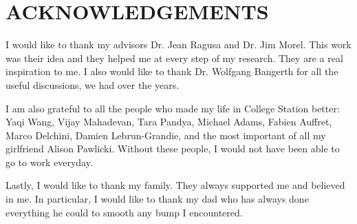 \chapter*{ACKNOWLEDGEMENTS}
\indent I would like to thank my advisors Dr. Jean Ragusa and Dr. Jim Morel. 
This work was their idea and they helped me at every step of my research. They 
are a real inspiration to me. I also would like to thank Dr. Wolfgang Bangerth 
for all the useful discussions, we had over the years.

\indent I am also grateful to all the people who made my life in College
Station better: Yaqi Wang, Vijay Mahadevan, Tara Pandya, Michael Adams, Fabien
Auffret, Marco Delchini, Damien Lebrun-Grandie, and the most important of all
my girlfriend Alison Pawlicki. Without these people, I would not have been
able to go to work everyday. 

\indent Lastly, I would like to thank my family. They always supported me and
believed in me. In particular, I would like to thank my dad who has always
done everything he could to smooth any bump I encountered.
\pagebreak{}
